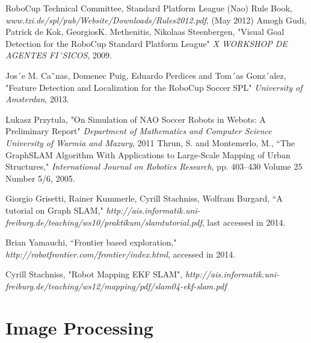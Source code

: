 \documentclass{ba-kecs}
\numberwithin{figure}{section}
\numberwithin{equation}{section}
\begin{document}
\begin{thebibliography}{99}

 RoboCup Technical Committee, Standard Platform League (Nao) Rule Book, \emph{www.tzi.de/spl/pub/Website/Downloads/Rules2012.pdf}, (May 2012)
 Amogh Gudi, Patrick de Kok, GeorgiosK. Methenitis, Nikolaas Steenbergen, "Visual Goal Detection for the RoboCup Standard Platform League" \emph{X WORKSHOP DE AGENTES FI´SICOS}, 2009.

 Jos´e M. Ca˜nas, Domenec Puig, Eduardo Perdices and Tom´as Gonz´alez, "Feature Detection and Localization for the
RoboCup Soccer SPL" \emph{University of Amsterdan}, 2013.

 Lukasz Przytula, "On Simulation of NAO Soccer Robots in Webots: A Preliminary Report" \emph{Department of Mathematics and Computer Science University of Warmia and Mazury}, 2011
 Thrun, S. and Montemerlo, M., ``The GraphSLAM Algorithm With Applications to Large-Scale Mapping of Urban Structures," \emph{International Journal on Robotics Research}, pp. 403--430 Volume 25 Number 5/6, 2005.

 Giorgio Grisetti, Rainer Kummerle, Cyrill Stachniss, Wolfram Burgard, ``A tutorial on Graph SLAM," \emph{http://ais.informatik.uni-freiburg.de/teaching/ws10/praktikum/slamtutorial.pdf}, last accessed in 2014.
 
 Brian Yamauchi, ``Frontier based exploration," \emph{http://robotfrontier.com/frontier/index.html}, accessed in 2014. 

 Cyrill Stachniss, "Robot Mapping EKF SLAM", \emph{http://ais.informatik.uni-freiburg.de/teaching/ws12/mapping/pdf/slam04-ekf-slam.pdf }


\end{thebibliography}

\appendix
\section{Image Processing}
\end{document}
